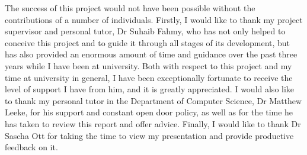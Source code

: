 The success of this project would not have been possible without the contributions of a number of individuals.
Firstly, I would like to thank my project supervisor and personal tutor, Dr Suhaib Fahmy, who has not only helped to conceive this project and to guide it through all stages of its development, but has also provided an enormous amount of time and guidance over the past three years while I have been at university.
Both with respect to this project and my time at university in general, I have been exceptionally fortunate to receive the level of support I have from him, and it is greatly appreciated.
I would also like to thank my personal tutor in the Department of Computer Science, Dr Matthew Leeke, for his support and constant open door policy, as well as for the time he has taken to review this report and offer advice.
Finally, I would like to thank Dr Sascha Ott for taking the time to view my presentation and provide productive feedback on it.

